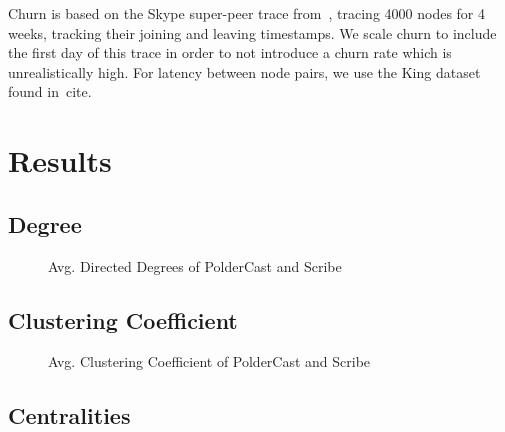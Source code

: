 Churn is based on the Skype super-peer trace from~\cite{}, tracing 4000
nodes for 4 weeks, tracking their joining and leaving timestamps. We
scale churn to include the first day of this trace in order to not
introduce a churn rate which is unrealistically high. For latency
between node pairs, we use the King dataset found in~cite{}.


\section{Results}

\subsection{Degree}

%     

%     

\begin{figure}[H]
    \centering
    \caption{Avg. Directed Degrees of PolderCast and Scribe}
    \label{fig:eval_directedtdegree}
\end{figure}

\subsection{Clustering Coefficient}
\begin{figure}[H]
    \centering
    
    \caption{Avg. Clustering Coefficient of PolderCast and Scribe}
    \label{fig:eval_cc}
\end{figure}

\subsection{Centralities}

%     

